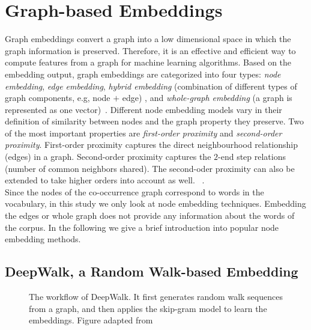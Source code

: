 \section{Graph-based Embeddings}
\label{sec:graph}
Graph embeddings convert a graph into a low dimensional space in which the graph information is preserved. Therefore, it is an effective and efficient way to compute features from a graph for machine learning algorithms. Based on the embedding output, graph embeddings are categorized into four types: \emph{node embedding}, \emph{edge embedding}, \emph{hybrid embedding} (combination of different types of graph components, e.g, node $+$ edge) , and  \emph{whole-graph embedding} (a graph is represented as one vector)~. Different node embedding models vary in their definition of similarity between nodes and the graph property they preserve. Two of the most important properties are \emph{first-order proximity} and \emph{second-order proximity}. First-order proximity captures the direct neighbourhood relationship (edges) in a graph. Second-order proximity captures the $2$-end step relations (number of common neighbors shared). The second-oder proximity can also be extended to take higher orders into account as well. ~.\\
Since the nodes of the co-occurrence graph correspond to words in the vocabulary, in this study we only look at node embedding techniques. Embedding the edges or whole graph does not provide any information about the words of the corpus. In the following we give a brief introduction into popular node embedding methods. 
\subsection{DeepWalk, a Random Walk-based Embedding}
\label{subsec:DeepWalk}
\begin{figure}
\centering 
\resizebox{0.8\textwidth}{0.35\textwidth}{      

}
\caption{The workflow of DeepWalk. It first generates random walk sequences
from a graph, and then applies the skip-gram model to learn the embeddings. Figure adapted from~}
\label{fig:deepwalk}
\end{figure}

